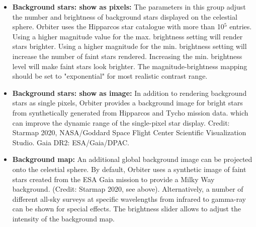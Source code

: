\documentclass[Orbiter User Manual.tex]{subfiles}
\begin{document}
\noindent
{}

\begin{itemize}
\item \textbf{Background stars: show as pixels:} The parameters in this group adjust the number and brightness of background stars displayed on the celestial sphere. Orbiter uses the Hipparcos star catalogue with more than 10$^{5}$ entries.\\
Using a higher magnitude value for the max. brightness setting will render stars brighter. Using a higher magnitude for the min. brightness setting will increase the number of faint stars rendered. Increasing the min. brightness level will make faint stars look brighter. The magnitude-brightness mapping should be set to "exponential" for most realistic contrast range.
\item \textbf{Background stars: show as image:} In addition to rendering background stars as single pixels, Orbiter provides a background image for bright stars from synthetically generated from Hipparcos and Tycho mission data. which can improve the dynamic range of the single-pixel star display. Credit: Starmap 2020, NASA/Goddard Space Flight Center Scientific Visualization Studio. Gaia DR2: ESA/Gaia/DPAC.
\item \textbf{Background map:} An additional global background image can be projected onto the celestial sphere. By default, Orbiter uses a synthetic image of faint stars created from the ESA Gaia mission to provide a Milky Way background. (Credit: Starmap 2020, see above). Alternatively, a number of different all-sky surveys at specific wavelengths from infrared to gamma-ray can be shown for special effects. The brightness slider allows to adjust the intensity of the background map.
\end{itemize}
\end{document}
